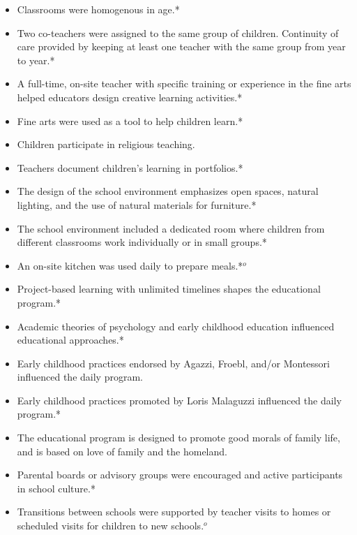 \begin{itemize}
\begin{itemize}
 	\item Classrooms were homogenous in age.*
 	\item Two co-teachers were assigned to the same group of children. Continuity of care provided by keeping at least one teacher with the same group from year to year.*
 	\item A full-time, on-site teacher with specific training or experience in the fine arts helped educators design creative learning activities.*
 	\item Fine arts were used as a tool to help children learn.*
 	\item Children participate in religious teaching.
 	\item Teachers document children's learning in portfolios.*
 	\item The design of the school environment emphasizes open spaces, natural lighting, and the use of natural materials for furniture.*
 	\item The school environment included a dedicated room where children from different classrooms work individually or in small groups.*
 	\item An on-site kitchen was used daily to prepare meals.*$^o$
 	\item Project-based learning with unlimited timelines shapes the educational program.*
 	\item Academic theories of psychology and early childhood education influenced educational approaches.*
 	\item Early childhood practices endorsed by Agazzi, Froebl, and/or Montessori influenced the daily program.
 	\item Early childhood practices promoted by Loris Malaguzzi influenced the daily program.*
 	\item The educational program is designed to promote good morals of family life, and is based on love of family and the homeland.
 	\item Parental boards or advisory groups were encouraged and active participants in school culture.*
	\item Transitions between schools were supported by teacher visits to homes or scheduled visits for children to new schools.$^o$
 \end{itemize}
 \end{itemize}
 
\doublespacing

